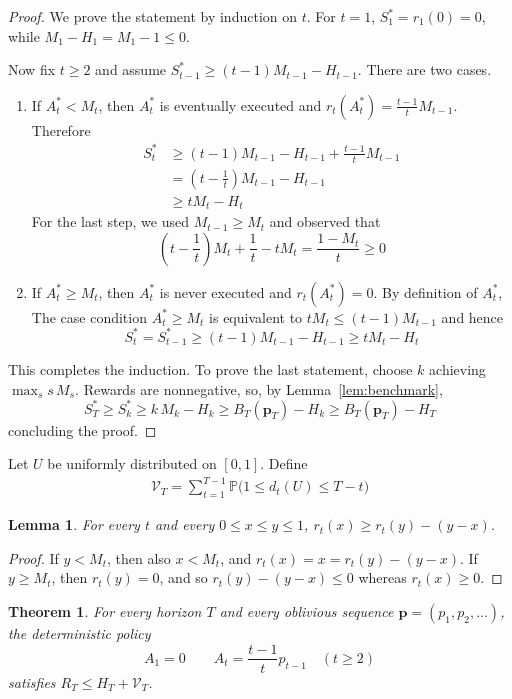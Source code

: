 \documentclass{article}
\newtheorem{theorem}{Theorem}
\newtheorem{lemma}{Lemma}
\renewcommand{\Pr}{\mathbb{P}}
\newcommand{\bp}{\boldsymbol{p}}
\newcommand{\cV}{\mathcal{V}}
\begin{document}
\begin{proof}
We prove the statement by induction on $t$. For $t=1$, $S^*_1 = r_1(0) = 0$, while $M_1 - H_1 = M_1 - 1 \le 0$.

Now fix $t\ge2$ and assume $S^*_{t-1} \ge (t-1)M_{t-1} - H_{t-1}$. There are two cases.
\begin{enumerate}
    \item If $A^*_t < M_t$, then $A^*_t$ is eventually executed and $r_t(A^*_t) = \frac{t-1}{t} M_{t-1}$. Therefore
\begin{align*}
    S^*_t
&\ge
    (t-1)M_{t-1} - H_{t-1} + \frac{t-1}{t}M_{t-1}
\\&=
    \left(t-\frac1t\right) M_{t-1} - H_{t-1}
\\&\ge
    t M_t-H_t
\end{align*}
For the last step, we used $M_{t-1}\ge M_t$ and observed that
\[
    \left(t-\frac1t\right)M_t + \frac{1}{t} - t M_t
=
    \frac{1-M_t}{t} \ge 0
\]
\item If $A^*_t\ge M_t$, then $A^*_t$ is never executed and $r_t(A^*_t) = 0$. By definition of $A^*_t$, The case condition $A^*_t\ge M_t$ is equivalent to $t M_t \le (t-1)M_{t-1}$ and hence
\[
    S^*_t = S^*_{t-1}
\ge
    (t-1)M_{t-1} - H_{t-1}
\ge
    t M_t - H_t
\]
\end{enumerate}
This completes the induction. To prove the last statement, choose $k$ achieving $\max_s s\,M_s$.  Rewards are nonnegative, so, by Lemma~\ref{lem:benchmark},
\[
    S^*_T
\ge
    S^*_k
\ge
    k\,M_k - H_k
 \ge
    B_T(\bp_T) - H_k
\ge
    B_T(\bp_T) - H_T
\]
concluding the proof.
\end{proof}
%
Let $U$ be uniformly distributed on $[0,1]$. Define
\begin{align}
    \cV_T
=
    \sum_{t=1}^{T-1} \Pr\bigl(1 \le d_t(U) \le T-t\bigr)
\end{align}
%
\begin{lemma}
\label{lem:one-sided-lipschitz}
For every $t$ and every $0\le x\le y\le1$,
$
r_t(x) \ge r_t(y) - (y-x)
$.
\end{lemma}
%
\begin{proof}
If $y < M_t$, then also $x < M_t$, and $r_t(x) = x = r_t(y) - (y-x)$. If $y \ge M_t$, then $r_t(y)=0$, and so $r_t(y) - (y-x) \le 0$
whereas $r_t(x) \ge 0$.
\end{proof}
%
\begin{theorem}
\label{thm:main}
For every horizon $T$ and every oblivious sequence $\bp = (p_1,p_2,\ldots)$, the deterministic policy
\begin{equation}
\label{eq:algorithm}
    A_1 = 0
\qquad
    A_t = \frac{t-1}{t}p_{t-1} \quad (t \ge 2)
\end{equation}
satisfies
$
    R_T
\le
    H_T + \cV_T
$.
\end{theorem}
\end{document}
